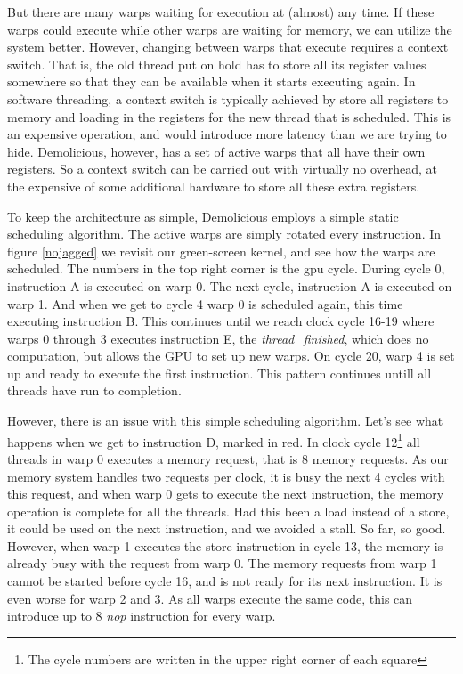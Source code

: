 \documentclass[../main/report.tex]{subfiles}
\begin{document}
But there are many warps waiting for execution at (almost) any time. 
If these warps could execute while other warps are waiting for memory, we can utilize the system better.
However, changing between warps that execute requires a context switch. 
That is, the old thread put on hold has to store all its register values somewhere so that they can be available when it starts executing again.
In software threading, a context switch is typically achieved by store all registers to memory and loading in the registers for the new thread that is scheduled.
This is an expensive operation, and would introduce more latency than we are trying to hide.
Demolicious, however, has a set of active warps that all have their own registers.
So a context switch can be carried out with virtually no overhead, at the expensive of some additional hardware to store all these extra registers.

To keep the architecture as simple, Demolicious employs a simple static scheduling algorithm. 
The active warps are simply rotated every instruction. In figure \ref{nojagged} we revisit our green-screen kernel, and see how the warps are scheduled. 
The numbers in the top right corner is the gpu cycle. 
During cycle 0, instruction A is executed on warp 0. 
The next cycle, instruction A is executed on warp 1. 
And when we get to cycle 4 warp 0 is scheduled again, this time executing instruction B.
This continues until we reach clock cycle 16-19 where warps 0 through 3 executes instruction E, the \emph{thread\_finished}, which does no computation, but allows the GPU to set up new warps.
On cycle 20, warp 4 is set up and ready to execute the first instruction.
This pattern continues untill all threads have run to completion. 

However, there is an issue with this simple scheduling algorithm. Let's see what happens when we get to instruction D, marked in red. In clock cycle 12\footnote{The cycle numbers are written in the upper right corner of each square} all threads in warp 0 executes a memory request, that is 8 memory requests. 
As our memory system handles two requests per clock, it is busy the next 4 cycles with this request, and when warp 0 gets to execute the next instruction, the memory operation is complete for all the threads.
Had this been a load instead of a store, it could be used on the next instruction, and we avoided a stall.
So far, so good.
However, when warp 1 executes the store instruction in cycle 13, the memory is already busy with the request from warp 0.
The memory requests from warp 1 cannot be started before cycle 16, and is not ready for its next instruction. 
It is even worse for warp 2 and 3. As all warps execute the same code, this can introduce up to 8 \emph{nop} instruction for every warp.
\end{document}
